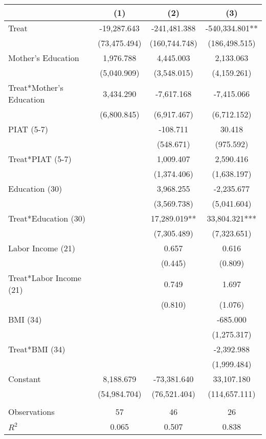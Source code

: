 \begin{tabular}{lccc} \toprule
 & (1) & (2) & (3) \\ \midrule
Treat & -19,287.643 & -241,481.388 & -540,334.801** \\
 & (73,475.494) & (160,744.748) & (186,498.515) \\
Mother's Education & 1,976.788 & 4,445.003 & 2,133.063 \\
 & (5,040.909) & (3,548.015) & (4,159.261) \\
Treat*Mother's Education & 3,434.290 & -7,617.168 & -7,415.066 \\
 & (6,800.845) & (6,917.467) & (6,712.152) \\
PIAT (5-7) &  & -108.711 & 30.418 \\
 &  & (548.671) & (975.592) \\
Treat*PIAT (5-7)  &  & 1,009.407 & 2,590.416 \\
 &  & (1,374.406) & (1,638.197) \\
Education (30) &  & 3,968.255 & -2,235.677 \\
 &  & (3,569.738) & (5,041.604) \\
Treat*Education (30) &  & 17,289.019** & 33,804.321*** \\
 &  & (7,305.489) & (7,323.651) \\
Labor Income (21) &  & 0.657 & 0.616 \\
 &  & (0.445) & (0.809) \\
Treat*Labor Income (21) &  & 0.749 & 1.697 \\
 &  & (0.810) & (1.076) \\
BMI (34) &  &  & -685.000 \\
 &  &  & (1,275.317) \\
Treat*BMI (34) &  &  & -2,392.988 \\
 &  &  & (1,999.484) \\
Constant & 8,188.679 & -73,381.640 & 33,107.180 \\
 & (54,984.704) & (76,521.404) & (114,657.111) \\ \\ \midrule
 Observations & 57 & 46 & 26 \\
$R^2$ & 0.065 & 0.507 & 0.838 \\ \bottomrule
\end{tabular}
